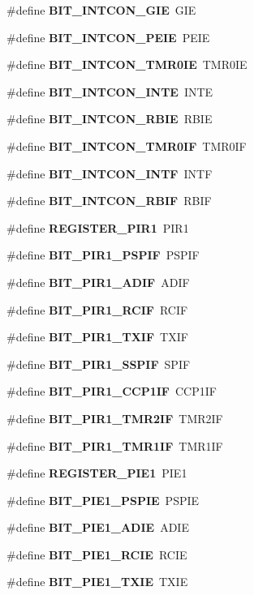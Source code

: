 \begin{DoxyCompactItemize}
\item 
\#define {\bf B\-I\-T\-\_\-\-I\-N\-T\-C\-O\-N\-\_\-\-G\-I\-E}~G\-I\-E
\item 
\#define {\bf B\-I\-T\-\_\-\-I\-N\-T\-C\-O\-N\-\_\-\-P\-E\-I\-E}~P\-E\-I\-E
\item 
\#define {\bf B\-I\-T\-\_\-\-I\-N\-T\-C\-O\-N\-\_\-\-T\-M\-R0\-I\-E}~T\-M\-R0\-I\-E
\item 
\#define {\bf B\-I\-T\-\_\-\-I\-N\-T\-C\-O\-N\-\_\-\-I\-N\-T\-E}~I\-N\-T\-E
\item 
\#define {\bf B\-I\-T\-\_\-\-I\-N\-T\-C\-O\-N\-\_\-\-R\-B\-I\-E}~R\-B\-I\-E
\item 
\#define {\bf B\-I\-T\-\_\-\-I\-N\-T\-C\-O\-N\-\_\-\-T\-M\-R0\-I\-F}~T\-M\-R0\-I\-F
\item 
\#define {\bf B\-I\-T\-\_\-\-I\-N\-T\-C\-O\-N\-\_\-\-I\-N\-T\-F}~I\-N\-T\-F
\item 
\#define {\bf B\-I\-T\-\_\-\-I\-N\-T\-C\-O\-N\-\_\-\-R\-B\-I\-F}~R\-B\-I\-F
\item 
\#define {\bf R\-E\-G\-I\-S\-T\-E\-R\-\_\-\-P\-I\-R1}~P\-I\-R1
\item 
\#define {\bf B\-I\-T\-\_\-\-P\-I\-R1\-\_\-\-P\-S\-P\-I\-F}~P\-S\-P\-I\-F
\item 
\#define {\bf B\-I\-T\-\_\-\-P\-I\-R1\-\_\-\-A\-D\-I\-F}~A\-D\-I\-F
\item 
\#define {\bf B\-I\-T\-\_\-\-P\-I\-R1\-\_\-\-R\-C\-I\-F}~R\-C\-I\-F
\item 
\#define {\bf B\-I\-T\-\_\-\-P\-I\-R1\-\_\-\-T\-X\-I\-F}~T\-X\-I\-F
\item 
\#define {\bf B\-I\-T\-\_\-\-P\-I\-R1\-\_\-\-S\-S\-P\-I\-F}~S\-P\-I\-F
\item 
\#define {\bf B\-I\-T\-\_\-\-P\-I\-R1\-\_\-\-C\-C\-P1\-I\-F}~C\-C\-P1\-I\-F
\item 
\#define {\bf B\-I\-T\-\_\-\-P\-I\-R1\-\_\-\-T\-M\-R2\-I\-F}~T\-M\-R2\-I\-F
\item 
\#define {\bf B\-I\-T\-\_\-\-P\-I\-R1\-\_\-\-T\-M\-R1\-I\-F}~T\-M\-R1\-I\-F
\item 
\#define {\bf R\-E\-G\-I\-S\-T\-E\-R\-\_\-\-P\-I\-E1}~P\-I\-E1
\item 
\#define {\bf B\-I\-T\-\_\-\-P\-I\-E1\-\_\-\-P\-S\-P\-I\-E}~P\-S\-P\-I\-E
\item 
\#define {\bf B\-I\-T\-\_\-\-P\-I\-E1\-\_\-\-A\-D\-I\-E}~A\-D\-I\-E
\item 
\#define {\bf B\-I\-T\-\_\-\-P\-I\-E1\-\_\-\-R\-C\-I\-E}~R\-C\-I\-E
\item 
\#define {\bf B\-I\-T\-\_\-\-P\-I\-E1\-\_\-\-T\-X\-I\-E}~T\-X\-I\-E

\end{DoxyCompactItemize}
